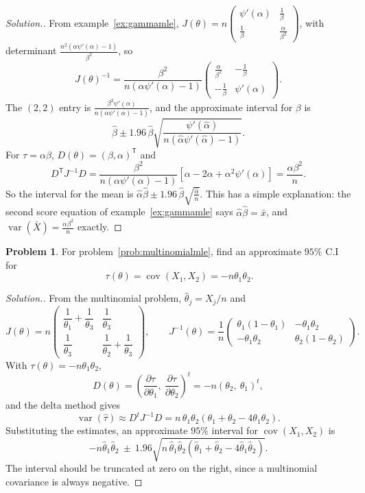 \documentclass[12pt,a4paper]{report}
\theoremstyle{definition}
\DeclareMathOperator{\var}{var}
\DeclareMathOperator{\cov}{cov}
\newtheorem{problemx}{Problem}[section]
\newenvironment{problem}{\begin{problemx}}{\end{problemx}}
\newenvironment{solution}
  {\renewcommand{\qedsymbol}{}\begin{proof}[\textit{Solution}.]}
  {\end{proof}}
\begin{document}
\begin{solution}
From example~\ref{ex:gammamle},
$J(\theta) = n\begin{pmatrix}\psi'(\alpha) & \frac1\beta\\ \frac1\beta & \frac{\alpha}{\beta^2}\end{pmatrix}$,
with determinant $\frac{n^2\left(\alpha\psi'(\alpha) - 1\right)}{\beta^2}$, so
\[J(\theta)^{-1} = \frac{\beta^2}{n\left(\alpha\psi'(\alpha) - 1\right)}
\begin{pmatrix}\frac{\alpha}{\beta^2} & -\frac1\beta\\[1ex] -\frac1\beta & \psi'(\alpha)\end{pmatrix}.\]
The $(2, 2)$ entry is $\frac{\beta^2\psi'(\alpha)}{n\left(\alpha\psi'(\alpha) - 1\right)}$, and
the approximate interval for $\beta$ is
\[\hat\beta\pm 1.96\,\hat\beta\sqrt{\frac{\psi'(\hat\alpha)}{n\left(\hat\alpha\psi'(\hat\alpha) - 1\right)}} .\]
For $\tau = \alpha\beta$, $D(\theta) = (\beta, \alpha)^{\mathsf T}$ and
\[D^{\mathsf T}J^{-1}D = \frac{\beta^2}{n\left(\alpha\psi'(\alpha) - 1\right)}
\left[\alpha - 2\alpha + \alpha^2\psi'(\alpha)\right]
= \frac{\alpha\beta^2}{n} .\]
So the interval for the mean is $\hat\alpha\hat\beta\pm 1.96\,\hat\beta\sqrt{\frac{\hat\alpha}{n}}$.
This has a simple explanation: the second score equation of example~\ref{ex:gammamle}
says $\hat\alpha\hat\beta = \bar x$, and $\var(\bar X) = \frac{\alpha\beta^2}{n}$ exactly.
\end{solution}

\begin{problem}
For problem~\ref{prob:multinomialmle}, find an approximate $95\%$ C.I for \[\ \tau (\theta) = \cov (X_1, X_2) = -n\theta_1\theta_2.\]
\end{problem}

\begin{solution}
From the multinomial problem, $\widehat{\theta}_j = X_j/n$ and
\[J(\theta) = n\begin{pmatrix}
\dfrac{1}{\theta_1}+\dfrac{1}{\theta_3} & \dfrac{1}{\theta_3}\\[6pt]
\dfrac{1}{\theta_3} & \dfrac{1}{\theta_2}+\dfrac{1}{\theta_3}\end{pmatrix},
\qquad
J^{-1}(\theta) = \frac{1}{n}\begin{pmatrix}
\theta_1(1-\theta_1) & -\theta_1\theta_2\\
-\theta_1\theta_2 & \theta_2(1-\theta_2)\end{pmatrix}.\]
With $\tau(\theta) = -n\theta_1\theta_2$,
\[D(\theta) = \left(\frac{\partial\tau}{\partial\theta_1},\ \frac{\partial\tau}{\partial\theta_2}\right)^{t}
= -n\left(\theta_2,\ \theta_1\right)^{t},\]
and the delta method gives
\[\var\left(\widehat{\tau}\right) \approx D^{t}J^{-1}D
= n\,\theta_1\theta_2\left(\theta_1+\theta_2-4\theta_1\theta_2\right).\]
Substituting the estimates, an approximate $95\%$ interval for
$\cov(X_1,X_2)$ is
\[-n\widehat{\theta}_1\widehat{\theta}_2 \ \pm\ 1.96
\sqrt{n\,\widehat{\theta}_1\widehat{\theta}_2
\left(\widehat{\theta}_1+\widehat{\theta}_2-4\widehat{\theta}_1\widehat{\theta}_2\right)} .\]
The interval should be truncated at zero on the right, since a multinomial
covariance is always negative.
\end{solution}
\end{document}
